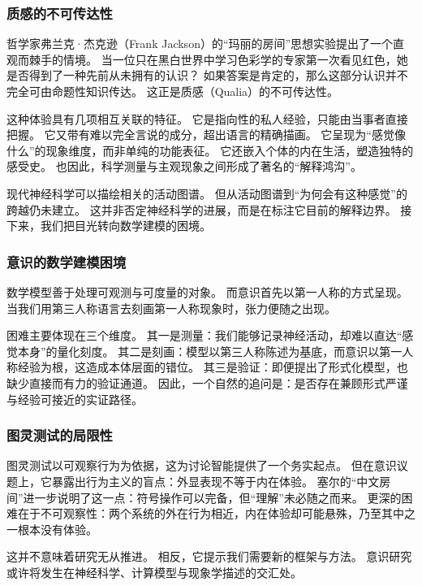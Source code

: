 \subsubsection{质感的不可传达性}

哲学家弗兰克·杰克逊（Frank Jackson）的“玛丽的房间”思想实验提出了一个直观而棘手的情境。
当一位只在黑白世界中学习色彩学的专家第一次看见红色，她是否得到了一种先前从未拥有的认识？
如果答案是肯定的，那么这部分认识并不完全可由命题性知识传达。
这正是质感（Qualia）的不可传达性。

这种体验具有几项相互关联的特征。
它是指向性的私人经验，只能由当事者直接把握。
它又带有难以完全言说的成分，超出语言的精确描画。
它呈现为“感觉像什么”的现象维度，而非单纯的功能表征。
它还嵌入个体的内在生活，塑造独特的感受史。
也因此，科学测量与主观现象之间形成了著名的“解释鸿沟”。

现代神经科学可以描绘相关的活动图谱。
但从活动图谱到“为何会有这种感觉”的跨越仍未建立。
这并非否定神经科学的进展，而是在标注它目前的解释边界。
接下来，我们把目光转向数学建模的困境。

\subsubsection{意识的数学建模困境}

数学模型善于处理可观测与可度量的对象。
而意识首先以第一人称的方式呈现。
当我们用第三人称语言去刻画第一人称现象时，张力便随之出现。

困难主要体现在三个维度。
其一是测量：我们能够记录神经活动，却难以直达“感觉本身”的量化刻度。
其二是刻画：模型以第三人称陈述为基底，而意识以第一人称经验为根，这造成本体层面的错位。
其三是验证：即便提出了形式化模型，也缺少直接而有力的验证通道。
因此，一个自然的追问是：是否存在兼顾形式严谨与经验可接近的实证路径。

\subsubsection{图灵测试的局限性}

图灵测试以可观察行为为依据，这为讨论智能提供了一个务实起点。
但在意识议题上，它暴露出行为主义的盲点：外显表现不等于内在体验。
塞尔的“中文房间”进一步说明了这一点：符号操作可以完备，但“理解”未必随之而来。
更深的困难在于不可观察性：两个系统的外在行为相近，内在体验却可能悬殊，乃至其中之一根本没有体验。

\begin{center}
这并不意味着研究无从推进。
相反，它提示我们需要新的框架与方法。
意识研究或许将发生在神经科学、计算模型与现象学描述的交汇处。
\end{center}

